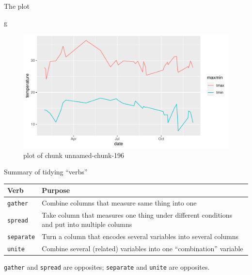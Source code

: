 \documentclass[ignorenonframetext,]{beamer}
\newenvironment{Shaded}{\begin{snugshade}}{\end{snugshade}}
\newcommand{\NormalTok}[1]{#1}
\begin{document}
\begin{frame}[fragile]{The plot}
\protect\hypertarget{the-plot}{}

\begin{Shaded}
\begin{Highlighting}[]
\NormalTok{g}
\end{Highlighting}
\end{Shaded}

\begin{figure}
\centering
\includegraphics{figure/unnamed-chunk-196-1.pdf}
\caption{plot of chunk unnamed-chunk-196}
\end{figure}

\end{frame}

\begin{frame}{Summary of tidying ``verbs''}
\protect\hypertarget{summary-of-tidying-verbs}{}

\begin{tabular}{lp{}}
    Verb & Purpose\\
    \hline
    \texttt{gather}& Combine columns that measure same thing into one\\
    \texttt{spread}& Take column that measures one thing under
                     different conditions and put into multiple columns\\
    \texttt{separate} & Turn a column that encodes
                        several variables into
                        several columns\\
    \texttt{unite} & Combine several (related) variables into one
                     ``combination'' variable\\
    \hline
  \end{tabular}

\texttt{gather} and \texttt{spread} are opposites; \texttt{separate} and
\texttt{unite} are opposites.

\end{frame}
\end{document}
